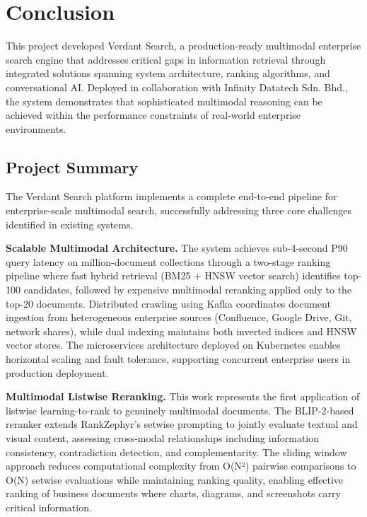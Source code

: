 \chapter{Conclusion}

This project developed Verdant Search, a production-ready multimodal enterprise search engine that addresses critical gaps in information retrieval through integrated solutions spanning system architecture, ranking algorithms, and conversational AI. Deployed in collaboration with Infinity Datatech Sdn. Bhd., the system demonstrates that sophisticated multimodal reasoning can be achieved within the performance constraints of real-world enterprise environments.

\section{Project Summary}

The Verdant Search platform implements a complete end-to-end pipeline for enterprise-scale multimodal search, successfully addressing three core challenges identified in existing systems.

\textbf{Scalable Multimodal Architecture.} The system achieves sub-4-second P90 query latency on million-document collections through a two-stage ranking pipeline where fast hybrid retrieval (BM25 + HNSW vector search) identifies top-100 candidates, followed by expensive multimodal reranking applied only to the top-20 documents. Distributed crawling using Kafka coordinates document ingestion from heterogeneous enterprise sources (Confluence, Google Drive, Git, network shares), while dual indexing maintains both inverted indices and HNSW vector stores. The microservices architecture deployed on Kubernetes enables horizontal scaling and fault tolerance, supporting concurrent enterprise users in production deployment.

\textbf{Multimodal Listwise Reranking.} This work represents the first application of listwise learning-to-rank to genuinely multimodal documents. The BLIP-2-based reranker extends RankZephyr's setwise prompting to jointly evaluate textual and visual content, assessing cross-modal relationships including information consistency, contradiction detection, and complementarity. The sliding window approach reduces computational complexity from O(N²) pairwise comparisons to O(N) setwise evaluations while maintaining ranking quality, enabling effective ranking of business documents where charts, diagrams, and screenshots carry critical information.

